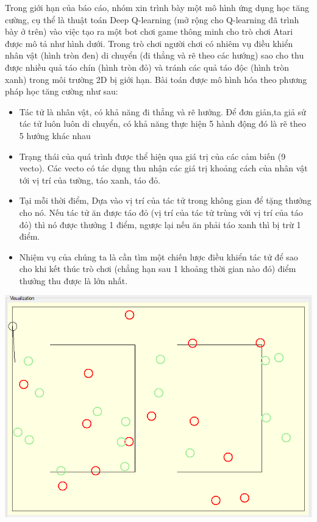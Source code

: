 \documentclass[14pt,a4paper,oneside]{report}		%
\begin{document}
Trong giới hạn của báo cáo, nhóm xin trình bày một mô hình ứng dụng học tăng cường, cụ thể là thuật toán Deep Q-learning (mở rộng cho Q-learning đã trình bày ở trên) vào việc tạo ra một bot chơi game thông minh cho trò chơi Atari được mô tả như hình dưới. Trong trò chơi người chơi có nhiêm vụ điều khiển nhân vật (hình tròn đen) di chuyển (đi thẳng và rẽ theo các hướng) sao cho thu được nhiều quả táo chín (hình tròn đỏ) và tránh các quả táo độc (hình tròn xanh) trong môi trường 2D bị giới hạn. Bài toán được mô hình hóa theo phương pháp học tăng cường như sau:
\begin{itemize}
\item Tác tử là nhân vật, có khả năng đi thẳng và rẽ hướng. Để đơn giản,ta giả sử tác tử luôn luôn di chuyển, có khả năng thực hiện 5 hành động đó là rẽ theo 5 hướng khác nhau
\item Trạng thái của quá trình được thể hiện qua giá trị của các cảm biến (9 vecto). Các vecto có tác dụng thu nhận các giá trị khoảng cách của nhân vật tới vị trí của tường, táo xanh, táo đỏ.
\item Tại mỗi thời điểm, Dựa vào vị trí của tác tử trong không gian để tặng thưởng cho nó. Nếu tác tử ăn được táo đỏ (vị trí của tác tử trùng với vị trí của táo đỏ) thì nó được thưởng 1 điểm, ngược lại nếu ăn phải táo xanh thì bị trừ 1 điểm.
\item Nhiệm vụ của chúng ta là cần tìm một chiến lược điều khiển tác tử để sao cho khi kết thúc trò chơi (chẳng hạn sau 1 khoảng thời gian nào đó) điểm thưởng thu được là lớn nhất.
\end{itemize}
\includegraphics[width=\textwidth,height=\textheight,keepaspectratio]{6.png}
\end{document}
